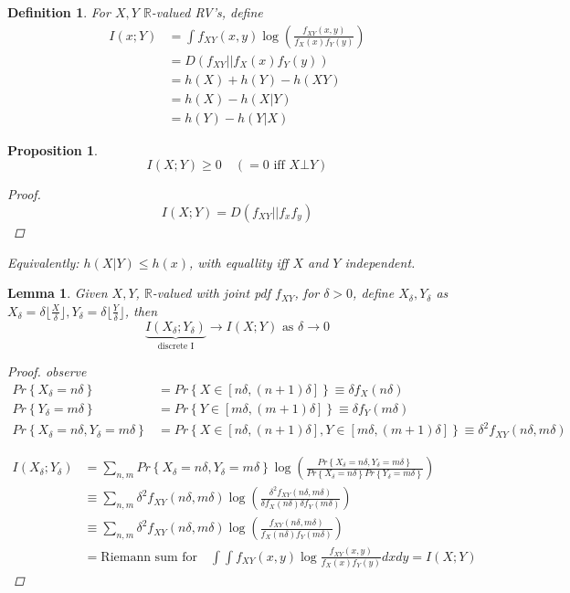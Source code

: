 \documentclass{article}
\newtheorem{lemma}[theorem]{Lemma}
\newtheorem{definition}{Definition}[section]
\newtheorem{proposition}{Proposition}[section]
\theoremstyle{definition} %
\renewcommand{\Pr}[1]{Pr\left\{#1\right\}}
\def\R{\mathbb{R}}
\begin{document}
\begin{definition}
  For $X, Y$ $\R$-valued RV's, define
  \begin{align*}
    I(x ; Y) &= \int f_{XY}(x,y) \log(\frac{f_{XY}(x, y)}{f_X(x) f_Y(y)}) \\
    &= D(f_{XY} || f_X(x) f_Y(y)) \\
    &= h(X) + h(Y) - h(XY) \\
    &= h(X) - h(X | Y) \\
    &= h(Y) - h(Y | X)
  \end{align*}
\end{definition}

\begin{proposition}
  \[
    I(X ; Y) \geq 0 \quad (=0 \text{ iff } X \bot Y)
  \]
  \begin{proof}
    \[
      I(X ; Y) = D(f_{XY} || f_x f_y)
    \]
  \end{proof}
  \textit{Equivalently}: $h(X | Y) \leq h(x)$, with equallity iff $X$ and $Y$ independent.
\end{proposition}

\begin{lemma}
  Given $X, Y$, $\R$-valued with joint pdf $f_{XY}$, for $\delta > 0$, define $X_{\delta}, Y_{\delta}$ as $X_{\delta} = \delta \lfloor \frac{X}{\delta} \rfloor, Y_{\delta} = \delta \lfloor \frac{Y}{\delta} \rfloor$, then
  \[
    \underbrace{I(X_{\delta}; Y_{\delta})}_{\text{discrete I}} \rightarrow I(X ; Y) \text{ as } \delta \rightarrow 0
  \]

  \begin{proof}
    observe
    \begin{align*}
      \Pr{X_{\delta} = n \delta} &= \Pr{X \in [n \delta, (n+1)\delta]} \equiv \delta f_X(n \delta) \\
      \Pr{Y_{\delta} = m \delta} &= \Pr{Y \in [m \delta, (m+1)\delta]} \equiv \delta f_Y(m \delta) \\
      \Pr{X_{\delta} = n \delta, Y_{\delta} = m \delta}
      &= \Pr{X \in [n \delta, (n+1) \delta], Y \in [m \delta, (m+1)\delta]} \equiv \delta^2 f_{XY}(n \delta, m \delta)
    \end{align*}

    \begin{align*}
      I(X_{\delta} ; Y_{\delta})
      &= \sum_{n, m} \Pr{X_{\delta} = n \delta, Y_{\delta} = m \delta} \log(\frac{\Pr{X_{\delta} = n \delta, Y_{\delta} = m \delta}}{\Pr{X_{\delta} = n \delta} \Pr{Y_{\delta} = m \delta}}) \\
      &\equiv \sum_{n, m} \delta^2 f_{XY} (n \delta, m \delta) \log(\frac{\delta^2 f_{XY}(n \delta, m \delta)}{\delta f_X(n \delta) \delta f_Y(m \delta)}) \\
      &\equiv \sum_{n, m} \delta^2 f_{XY} (n \delta, m \delta) \log(\frac{f_{XY}(n \delta, m \delta)}{f_X(n \delta) f_Y(m \delta)}) \\
      &= \text{Riemann sum for} \quad \int \int f_{XY}(x,y) \log \frac{f_{XY}(x,y)}{f_X(x) f_Y(y)}dx dy = I(X ; Y)
    \end{align*}
  \end{proof}
\end{lemma}
\end{document}
